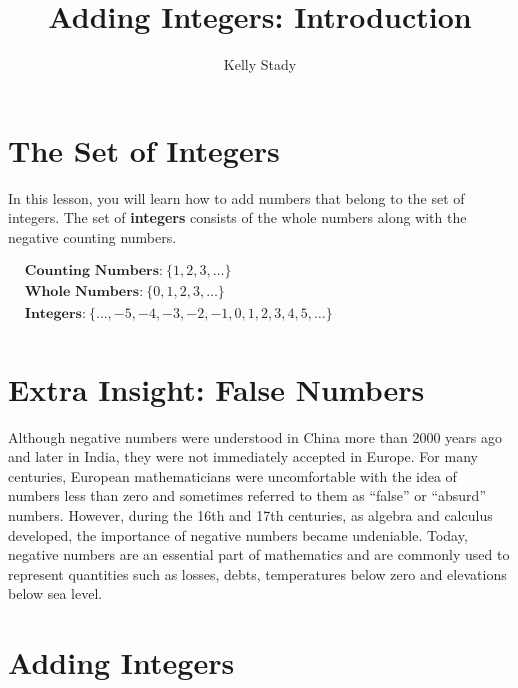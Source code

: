 \documentclass{ximera}[font=12pt]
\title{Adding Integers: Introduction}   %
\author{Kelly Stady}
\begin{document}
  


\begin{abstract}

\end{abstract}


\maketitle
\label{xim:AddIntroActivity}


\section*{The Set of Integers}

In this lesson, you will learn how to add numbers that belong to the set of integers.  The set of \textbf{integers} consists of the whole numbers along with the negative counting numbers.

\begin{flushleft}
\hspace{5em} %
$\begin{aligned}
& \textbf{Counting Numbers:} \ \{1, 2, 3, \dots\} \\[1.5ex]
& \textbf{Whole Numbers:} \ \{0, 1, 2, 3, \dots\} \\[1.5ex]
& \textbf{Integers:} \ \{ \ldots, -5, -4, -3, -2, -1, 0, 1, 2, 3, 4, 5, \ldots \} \\
\end{aligned}$
\end{flushleft}


\section*{Extra Insight: False Numbers}

Although negative numbers were understood in China more than 2000 years ago and later in India, they were not immediately accepted in Europe.
For many centuries, European mathematicians were uncomfortable with the idea of numbers less than zero and sometimes referred to them  as ``false'' or
``absurd'' numbers.  However, during the 16th and 17th centuries, as algebra and calculus developed, the importance of negative numbers became undeniable.
Today, negative numbers are an essential part of mathematics and are commonly used to represent quantities such as losses, debts, temperatures below zero and
elevations below sea level.

\section*{Adding Integers}
\end{document}
